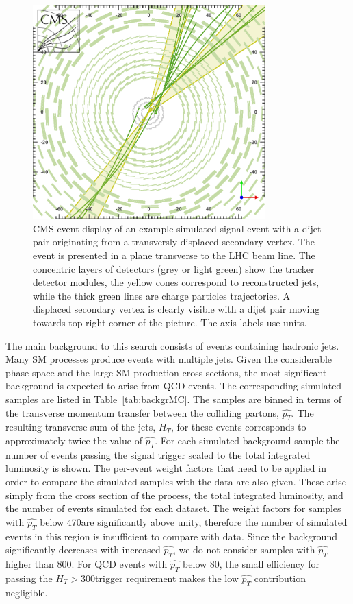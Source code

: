 \begin{figure}[htbp]
\centering
 \includegraphics[width=0.8\textwidth]{plots/eventDisplay.png}
\caption{CMS event display of an example simulated signal event with a dijet pair originating from a transversly displaced secondary vertex.
The event is presented in a plane transverse to the LHC beam line.
The concentric layers of detectors (grey or light green) show the tracker detector modules, the
yellow cones correspond to reconstructed jets, while the thick green lines are charge particles
trajectories. A displaced secondary vertex is clearly visible with a dijet pair moving towards
top-right corner of the picture.
The axis labels use \cm units. \label{fig:eventDisplay}}
\end{figure}


The main background to this search consists of events containing hadronic jets. Many SM processes
produce events with multiple jets. Given the considerable phase space and the large SM production 
cross sections,
 the most significant background 
is expected to arise from QCD events. The corresponding simulated samples
are listed in Table~\ref{tab:backgrMC}. The samples are binned in terms
of the transverse momentum transfer between the colliding partons, $\hat{p_T}$.
The resulting transverse sum
of the jets, $H_T$, for these events corresponds to approximately twice the value of $\hat{p_T}$. 
For each simulated background sample the number of events passing the signal trigger
scaled to the total integrated luminosity is shown. The per-event weight factors that need 
to be applied in order to compare the simulated samples with the data are also given. These
arise simply from the cross section of the process, the total integrated luminosity, and the number
of events simulated for each dataset.
The weight factors for samples with $\hat{p_T}$
below 470\GeV are significantly above unity, therefore the number of simulated events in this region is insufficient to compare with data.
Since the background significantly decreases with increased $\hat{p_T}$, we do not consider samples with $\hat{p_T}$ higher
than 800\GeV. For QCD events with $\hat{p_T}$ below 80\GeV, the small efficiency for  passing the $H_T>$300\GeV trigger requirement
makes the low $\hat{p_T}$ contribution negligible.

